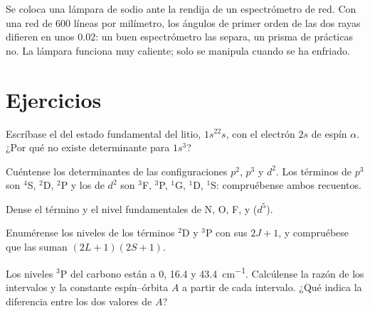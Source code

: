 \begin{inthelab}
Se coloca una lámpara de sodio ante la rendija de un espectrómetro de red. Con una
red de 600 líneas por milímetro, los ángulos de primer orden de las dos rayas
difieren en unos \num{0.02}\textdegree: un buen espectrómetro las separa, un
prisma de prácticas no. La lámpara funciona muy caliente; solo se manipula cuando se ha
enfriado.
\end{inthelab}

\section{Ejercicios}

\begin{exercise}[$\star$]\label{exo:b3:many-electron-atoms:1}
Escríbase el  del estado fundamental del litio, $1s^22s$, con
el electrón $2s$ de espín $\alpha$. ¿Por qué no existe determinante para
$1s^3$?
\end{exercise}

\begin{exercise}[$\star$]\label{exo:b3:many-electron-atoms:2}
Cuéntense los determinantes de las configuraciones $p^2$, $p^3$ y $d^2$. Los términos
de $p^3$ son ${}^4$S, ${}^2$D, ${}^2$P y los de $d^2$ son ${}^3$F, ${}^3$P, ${}^1$G,
${}^1$D, ${}^1$S: compruébense ambos recuentos.
\end{exercise}

\begin{exercise}[$\star$]\label{exo:b3:many-electron-atoms:3}
Dense el término y el nivel fundamentales de N, O, F,  y  ($d^5$).
\end{exercise}

\begin{exercise}[$\star$]\label{exo:b3:many-electron-atoms:4}
Enumérense los niveles de los términos ${}^2$D y ${}^3$P con sus  $2J+1$,
y compruébese que las  suman $(2L+1)(2S+1)$.
\end{exercise}

\begin{exercise}[$\star\star$]\label{exo:b3:many-electron-atoms:5}
Los niveles ${}^3$P del carbono están a 0, 16.4 y \qty{43.4}{cm^{-1}}. Calcúlense la
razón de los intervalos y la constante espín--órbita $A$ a partir de cada intervalo.
¿Qué indica la diferencia entre los dos valores de $A$?
\end{exercise}

